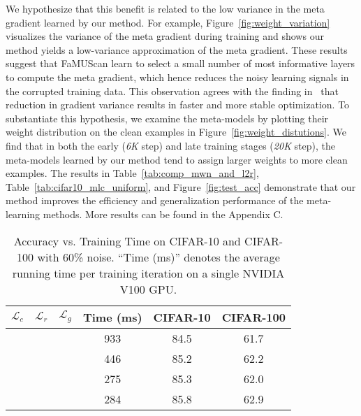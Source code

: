 \documentclass[final]{cvpr}
\newcommand{\methodnameabbre}{FaMUS}
\begin{document}
We hypothesize that this benefit is related to the low variance in the meta gradient learned by our method. For example, Figure~\ref{fig:weight_variation} visualizes the variance of the meta gradient during training and shows our method yields a low-variance approximation of the meta gradient. These results suggest that \methodnameabbre\space can learn to select a small number of most informative layers to compute the meta gradient, which hence reduces the noisy learning signals in the corrupted training data. This observation agrees with the finding in~\cite{neelakantan2015adding, miller2017reducing} that reduction in gradient variance results in faster and more stable optimization.
To substantiate this hypothesis, we examine the meta-models by plotting their weight distribution on the clean examples in Figure~\ref{fig:weight_distutions}. We find that in both the early (\textit{6K} step) and late training stages (\textit{20K} step), the meta-models learned by our method tend to assign larger weights to more clean examples.
The results in Table~\ref{tab:comp_mwn_and_l2r}, Table~\ref{tab:cifar10_mlc_uniform}, and  Figure~\ref{fig:test_acc} demonstrate that our method improves the efficiency and generalization performance of the meta-learning methods. More results can be found in the Appendix C.

\begin{table}[t]
	\centering
	\small
	\begin{tabular}{|ccc|c|c|c|}
		\hline
		$\mathcal{L}_c$ & $\mathcal{L}_r$ & $\mathcal{L}_g$ & Time (ms) &CIFAR-10 & CIFAR-100 \\
		\hline
		\checkmark &  &                      & 933  & 84.5  & 61.7 \\
		\hline
		\checkmark &          & \checkmark   & 446  & 85.2 & 62.2 \\
		\hline
		\checkmark & \checkmark &            & 275  & 85.3 & 62.0   \\
		\hline
		\checkmark & \checkmark & \checkmark & 284   & 85.8 & 62.9 \\
		\hline
	\end{tabular}
	\vspace{-1mm}
	\caption{Accuracy vs. Training Time on CIFAR-10 and CIFAR-100 with 60\% noise. 
	``Time (ms)'' denotes the average running time per training iteration on a single NVIDIA V100 GPU. 
	}\label{tab:ablation_loss_function}
\end{table}
 
\end{document}

